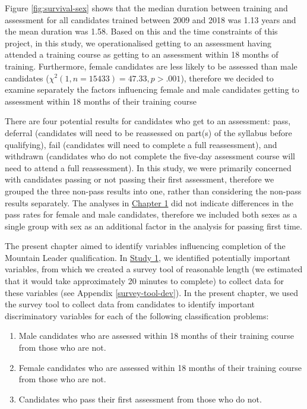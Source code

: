 \documentclass[
  12pt,
  a4paper,
]{book}
\providecommand{\tightlist}{%
  \setlength{\itemsep}{0pt}\setlength{\parskip}{0pt}}
\begin{document}
Figure \ref{fig:survival-sex} shows that the median duration between training and assessment for all candidates trained between 2009 and 2018 was 1.13 years and the mean duration was 1.58. Based on this and the time constraints of this project, in this study, we operationalised getting to an assessment having attended a training course as getting to an assessment within 18 months of training. Furthermore, female candidates are less likely to be assessed than male candidates (\(\chi^2( 1 ,n = 15433 )= 47.33 ,p>.001\)), therefore we decided to examine separately the factors influencing female and male candidates getting to assessment within 18 months of their training course

There are four potential results for candidates who get to an assessment: pass, deferral (candidates will need to be reassessed on part(s) of the syllabus before qualifying), fail (candidates will need to complete a full reassessment), and withdrawn (candidates who do not complete the five-day assessment course will need to attend a full reassessment). In this study, we were primarily concerned with candidates passing or not passing their first assessment, therefore we grouped the three non-pass results into one, rather than considering the non-pass results separately. The analyses in \protect\hyperlink{gen-intro}{Chapter 1} did not indicate differences in the pass rates for female and male candidates, therefore we included both sexes as a single group with sex as an additional factor in the analysis for passing first time.

The present chapter aimed to identify variables influencing completion of the Mountain Leader qualification. In \protect\hyperlink{ml-qualitative}{Study 1}, we identified potentially important variables, from which we created a survey tool of reasonable length (we estimated that it would take approximately 20 minutes to complete) to collect data for these variables (see Appendix \ref{survey-tool-dev}). In the present chapter, we used the survey tool to collect data from candidates to identify important discriminatory variables for each of the following classification problems:

\begin{enumerate}
\def\labelenumi{\arabic{enumi}.}
\tightlist
\item
  Male candidates who are assessed within 18 months of their training course from those who are not.
\item
  Female candidates who are assessed within 18 months of their training course from those who are not.
\item
  Candidates who pass their first assessment from those who do not.
\end{enumerate}
\end{document}
